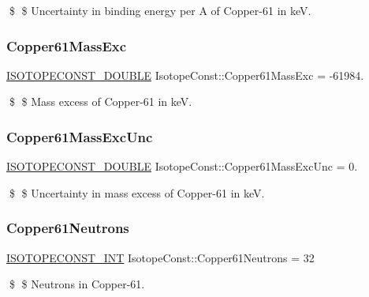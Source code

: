\$ \$ Uncertainty in binding energy per A of Copper-\/61 in keV. \mbox{\label{group___isotope_const-_copper-_cu61_gaaecd4172490d27050b64d4be4f5a60d5}} 
\subsubsection{\texorpdfstring{Copper61\+Mass\+Exc}{Copper61MassExc}}
{\footnotesize\ttfamily \mbox{\hyperlink{group___isotope_const-_macros_ga8f45a7272ce02c0b4c65c44636ed719a}{I\+S\+O\+T\+O\+P\+E\+C\+O\+N\+S\+T\+\_\+\+D\+O\+U\+B\+LE}} Isotope\+Const\+::\+Copper61\+Mass\+Exc = -\/61984.}

\$ \$ Mass excess of Copper-\/61 in keV. \mbox{\label{group___isotope_const-_copper-_cu61_ga871ba874ad055c8c852882f826a71d37}} 
\subsubsection{\texorpdfstring{Copper61\+Mass\+Exc\+Unc}{Copper61MassExcUnc}}
{\footnotesize\ttfamily \mbox{\hyperlink{group___isotope_const-_macros_ga8f45a7272ce02c0b4c65c44636ed719a}{I\+S\+O\+T\+O\+P\+E\+C\+O\+N\+S\+T\+\_\+\+D\+O\+U\+B\+LE}} Isotope\+Const\+::\+Copper61\+Mass\+Exc\+Unc = 0.}

\$ \$ Uncertainty in mass excess of Copper-\/61 in keV. \mbox{\label{group___isotope_const-_copper-_cu61_gaa203dafd7673aa59921e67920d9aecf7}} 
\subsubsection{\texorpdfstring{Copper61\+Neutrons}{Copper61Neutrons}}
{\footnotesize\ttfamily \mbox{\hyperlink{group___isotope_const-_macros_ga5f18360b3e99483a35c32d789e62621c}{I\+S\+O\+T\+O\+P\+E\+C\+O\+N\+S\+T\+\_\+\+I\+NT}} Isotope\+Const\+::\+Copper61\+Neutrons = 32}

\$ \$ Neutrons in Copper-\/61. \mbox{\label{group___isotope_const-_copper-_cu61_gad0ba469a1b30d19967d9b68ddf288620}} 
